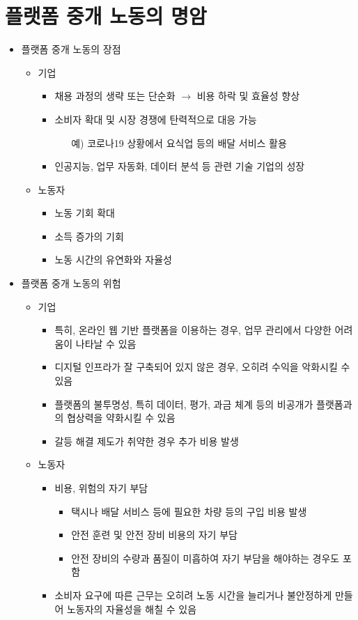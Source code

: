 \section{플랫폼 중개 노동의 명암}
\begin{itemize}
\item 플랫폼 중개 노동의 장점
	\begin{itemize}
	\item 기업
		\begin{itemize}
		\item 채용 과정의 생략 또는 단순화 $\rightarrow$ 비용 하락 및 효율성 향상
		\item 소비자 확대 및 시장 경쟁에 탄력적으로 대응 가능
			\begin{itemize}
			\item[예)] 코로나19 상황에서 요식업 등의 배달 서비스 활용
			\end{itemize}
		\item 인공지능, 업무 자동화, 데이터 분석 등 관련 기술 기업의 성장
		\end{itemize}
	\item 노동자
		\begin{itemize}
		\item 노동 기회 확대
		\item 소득 증가의 기회
		\item 노동 시간의 유연화와 자율성
		\end{itemize}
	\end{itemize}
\item 플랫폼 중개 노동의 위험
	\begin{itemize}
	\item 기업
		\begin{itemize}
		\item 특히, 온라인 웹 기반 플랫폼을 이용하는 경우, 업무 관리에서 다양한 어려움이 나타날 수 있음
		\item 디지털 인프라가 잘 구축되어 있지 않은 경우, 오히려 수익을 악화시킬 수 있음
		\item 플랫폼의 불투명성, 특히 데이터, 평가, 과금 체계 등의 비공개가 플랫폼과의 협상력을 약화시킬 수 있음
		\item 갈등 해결 제도가 취약한 경우 추가 비용 발생
		\end{itemize}
	\item 노동자
		\begin{itemize}
		\item 비용, 위험의 자기 부담
			\begin{itemize}
			\item 택시나 배달 서비스 등에 필요한 차량 등의 구입 비용 발생
			\item 안전 훈련 및 안전 장비 비용의 자기 부담 
			\item 안전 장비의 수량과 품질이 미흡하여 자기 부담을 해야하는 경우도 포함
			\end{itemize}
		\item 소비자 요구에 따른 근무는 오히려 노동 시간을 늘리거나 불안정하게 만들어 노동자의 자율성을 해칠 수 있음
		\end{itemize}
	\end{itemize}
\end{itemize}

